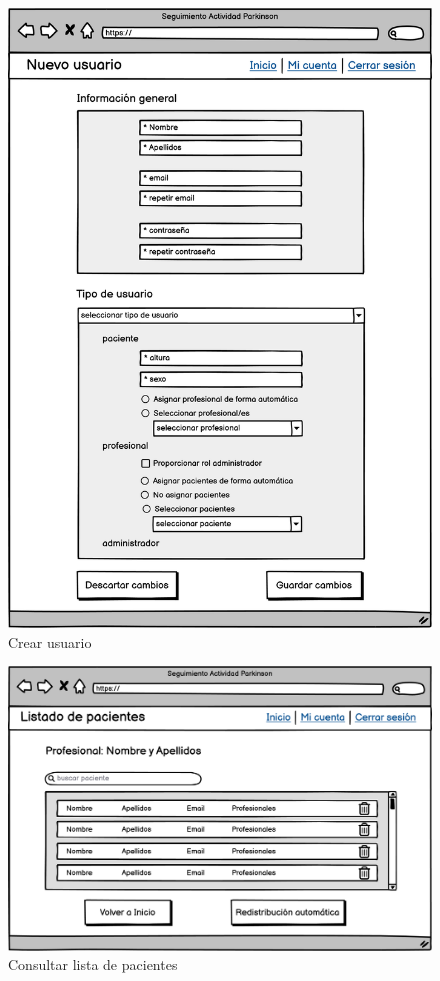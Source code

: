 \begin{figure}[h]
    \centering
    \includegraphics[width=1\textwidth]{img/UI_Wireframes/UI_CU-9_Crear usuario.png}
    \caption{Crear usuario}
    \label{fig:Crear usuario}
\end{figure}

\begin{figure}[h]
    \centering
    \includegraphics[width=1\textwidth]{img/UI_Wireframes/UI_CU-15_Consultar lista de pacientes.png}
    \caption{Consultar lista de pacientes}
    \label{fig:Consultar lista de pacientes}
\end{figure}

